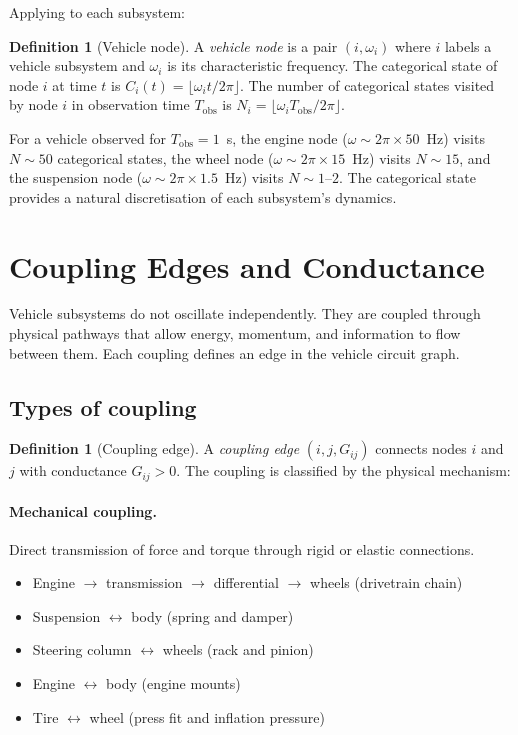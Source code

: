 \documentclass[twocolumn,10pt,a4paper]{article}
\theoremstyle{definition}
\newtheorem{definition}[theorem]{Definition}
\theoremstyle{remark}
\begin{document}
Applying  to each subsystem:

\begin{definition}[Vehicle node]\label{def:vehicle_node}
A \emph{vehicle node} is a pair $(i, \omega_i)$ where $i$ labels a vehicle subsystem and $\omega_i$ is its characteristic frequency. The categorical state of node $i$ at time $t$ is $C_i(t) = \lfloor \omega_i t / 2\pi \rfloor$. The number of categorical states visited by node $i$ in observation time $T_{\mathrm{obs}}$ is $N_i = \lfloor \omega_i T_{\mathrm{obs}} / 2\pi \rfloor$.
\end{definition}

For a vehicle observed for $T_{\mathrm{obs}} = 1$~s, the engine node ($\omega \sim 2\pi \times 50$~Hz) visits $N \sim 50$ categorical states, the wheel node ($\omega \sim 2\pi \times 15$~Hz) visits $N \sim 15$, and the suspension node ($\omega \sim 2\pi \times 1.5$~Hz) visits $N \sim 1$--$2$. The categorical state provides a natural discretisation of each subsystem's dynamics.


\section{Coupling Edges and Conductance}\label{sec:edges}

Vehicle subsystems do not oscillate independently. They are coupled through physical pathways that allow energy, momentum, and information to flow between them. Each coupling defines an edge in the vehicle circuit graph.

\subsection{Types of coupling}

\begin{definition}[Coupling edge]\label{def:coupling_edge}
A \emph{coupling edge} $(i, j, G_{ij})$ connects nodes $i$ and $j$ with conductance $G_{ij} > 0$. The coupling is classified by the physical mechanism:
\end{definition}

\paragraph{Mechanical coupling.} Direct transmission of force and torque through rigid or elastic connections.
\begin{itemize}
\item Engine $\to$ transmission $\to$ differential $\to$ wheels (drivetrain chain)
\item Suspension $\leftrightarrow$ body (spring and damper)
\item Steering column $\leftrightarrow$ wheels (rack and pinion)
\item Engine $\leftrightarrow$ body (engine mounts)
\item Tire $\leftrightarrow$ wheel (press fit and inflation pressure)
\end{itemize}
\end{document}
